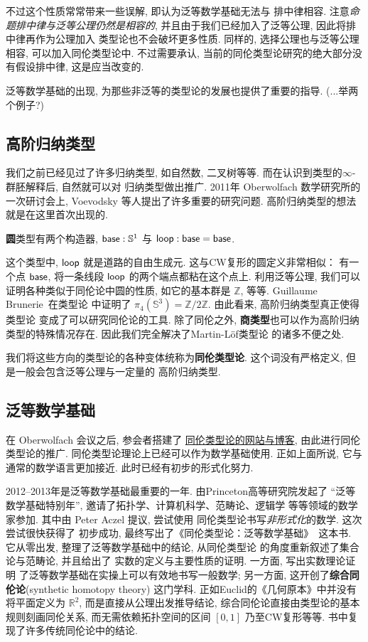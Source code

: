 不过这个性质常常带来一些误解, 即认为泛等数学基础无法与
排中律相容. 注意\emph{命题排中律与泛等公理仍然是相容的},
并且由于我们已经加入了泛等公理, 因此将排中律再作为公理加入
类型论也不会破坏更多性质. 同样的, 选择公理也与泛等公理相容,
可以加入同伦类型论中.
不过需要承认, 当前的同伦类型论研究的绝大部分没有假设排中律, 这是应当改变的.

泛等数学基础的出现, 为那些非泛等的类型论的发展也提供了重要的指导.
(...举两个例子?)

\subsection{高阶归纳类型}
我们之前已经见过了许多归纳类型, 如自然数, 二叉树等等.
而在认识到类型的\(\infty\)-群胚解释后, 自然就可以对
归纳类型做出推广. 2011年 Oberwolfach 数学研究所的
一次研讨会上, Voevodsky 等人提出了许多重要的研究问题.
高阶归纳类型的想法就是在这里首次出现的.

\begin{definition}
\textbf{圆}类型有两个构造器, \(\textnormal{\textsf{base}} : \mathbb S^1\)
与 \(\textnormal{\textsf{loop}} : \textnormal{\textsf{base}} = \textnormal{\textsf{base}}\).
\end{definition}
这个类型中, \(\textnormal{\textsf{loop}}\) 就是道路的自由生成元.
这与CW复形的圆定义非常相似： 有一个点 \(\textnormal{\textsf{base}}\),
将一条线段 \(\textnormal{\textsf{loop}}\) 的两个端点都粘在这个点上.
利用泛等公理, 我们可以证明各种类似于同伦论中圆的性质,
如它的基本群是 \(\mathbb Z\), 等等.
Guillaume Brunerie~\cite{brunerie:2016:number}在类型论
中证明了 \(\pi_4(\mathbb S^3) = \mathbb Z / 2\mathbb Z\).
由此看来, 高阶归纳类型真正使得类型论
变成了可以研究同伦论的工具.
除了同伦之外, \textbf{商类型}也可以作为高阶归纳
类型的特殊情况存在. 因此我们完全解决了Martin-L\"of类型论
的诸多不便之处.

我们将这些方向的类型论的各种变体统称为\textbf{同伦类型论}.
这个词没有严格定义, 但是一般会包含泛等公理与一定量的
高阶归纳类型.

\subsection{泛等数学基础}
在 Oberwolfach 会议之后, 参会者搭建了%
\href{http://homotopytypetheory.org/}{同伦类型论的网站与博客},
由此进行同伦类型论的推广.
同伦类型论理论上已经可以作为数学基础使用. 正如上面所说, 它与
通常的数学语言更加接近. 此时已经有初步的形式化努力.

2012--2013年是泛等数学基础最重要的一年. 由Princeton高等研究院发起了
“泛等数学基础特别年”, 邀请了拓扑学、计算机科学、范畴论、逻辑学
等等领域的数学家参加. 其中由 Peter Aczel 提议, 尝试使用
同伦类型论书写\emph{非形式化}的数学. 这次尝试很快获得了
初步成功, 最终写出了《同伦类型论：泛等数学基础》~\cite{ufp:2013:hottbook}这本书.
它从零出发, 整理了泛等数学基础中的结论, 从同伦类型论
的角度重新叙述了集合论与范畴论, 并且给出了
实数的定义与主要性质的证明. 一方面, 写出实数理论证明
了泛等数学基础在实操上可以有效地书写一般数学; 另一方面,
这开创了\textbf{综合同伦论}(synthetic homotopy theory)
这门学科. 正如Euclid的《几何原本》中并没有将平面定义为
\(\mathbb R^2\), 而是直接从公理出发推导结论,
综合同伦论直接由类型论的基本规则刻画同伦关系,
而无需依赖拓扑空间的区间 \([0,1]\) 乃至CW复形等等.
书中复现了许多传统同伦论中的结论.

